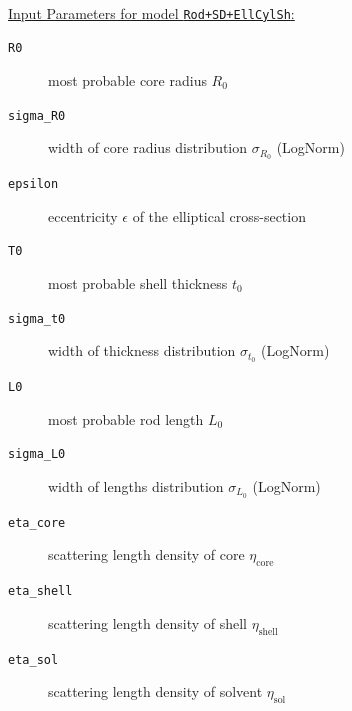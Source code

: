 \hspace{1pt}\\
\underline{Input Parameters for model \texttt{Rod+SD+EllCylSh}:}\\
\begin{description}
\item[\texttt{R0}] most probable core radius $R_0$
\item[\texttt{sigma\_R0}] width of core radius distribution $\sigma_{R_0}$  (LogNorm)
\item[\texttt{epsilon}] eccentricity $\epsilon$ of the elliptical cross-section
\item[\texttt{T0}] most probable shell thickness $t_0$
\item[\texttt{sigma\_t0}] width of thickness distribution $\sigma_{t_0}$ (LogNorm)
\item[\texttt{L0}] most probable rod length $L_0$
\item[\texttt{sigma\_L0}] width of lengths distribution $\sigma_{L_0}$ (LogNorm)
\item[\texttt{eta\_core}] scattering length density of core $\eta_\mathrm{core}$
\item[\texttt{eta\_shell}] scattering length density of shell $\eta_\mathrm{shell}$
\item[\texttt{eta\_sol}] scattering length density of solvent $\eta_\mathrm{sol}$
\end{description}
